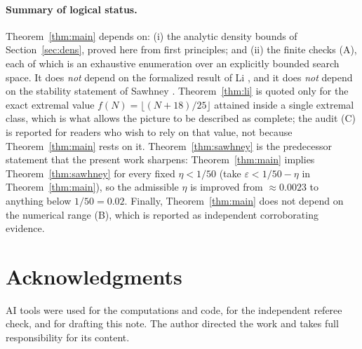 \documentclass[11pt,a4paper]{article}
\theoremstyle{plain}
\theoremstyle{definition}
\theoremstyle{remark}
\begin{document}
\paragraph{Summary of logical status.}
Theorem~\ref{thm:main} depends on: (i) the analytic density bounds of Section~\ref{sec:dens},
proved here from first principles; and (ii) the finite checks (A), each of which is an exhaustive
enumeration over an explicitly bounded search space. It does \emph{not} depend on the formalized
result of Li \cite{Li,LiRepo}, and it does \emph{not} depend on the stability statement of Sawhney
\cite{Sawhney}. Theorem~\ref{thm:li} is quoted only for the exact extremal value
$f(N)=\lfloor (N+18)/25\rfloor$ attained inside a single extremal class, which is what allows the
picture to be described as complete; the audit (C) is reported for readers who wish to rely on that
value, not because Theorem~\ref{thm:main} rests on it. Theorem~\ref{thm:sawhney} is the predecessor
statement that the present work sharpens: Theorem~\ref{thm:main} implies
Theorem~\ref{thm:sawhney} for every fixed $\eta<1/50$ (take $\varepsilon<1/50-\eta$ in
Theorem~\ref{thm:main}), so the admissible $\eta$ is improved from $\approx 0.0023$ to anything
below $1/50=0.02$. Finally, Theorem~\ref{thm:main} does not depend on the numerical range (B),
which is reported as independent corroborating evidence.

\section*{Acknowledgments}
AI tools were used for the computations and code, for the independent referee check, and for
drafting this note. The author directed the work and takes full responsibility for its content.
\end{document}
